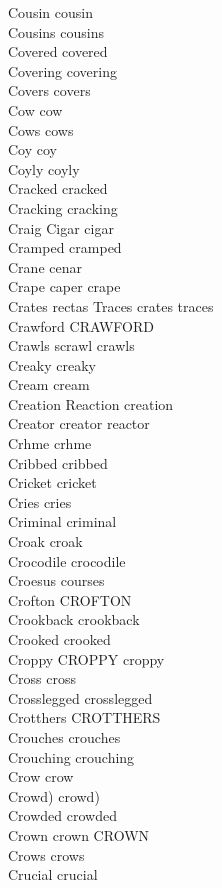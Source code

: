 Cousin cousin\\
Cousins cousins\\
Covered covered\\
Covering covering\\
Covers covers\\
Cow cow\\
Cows cows\\
Coy coy\\
Coyly coyly\\
Cracked cracked\\
Cracking cracking\\
Craig Cigar cigar\\
Cramped cramped\\
Crane cenar\\
Crape caper crape\\
Crates rectas Traces crates traces\\
Crawford CRAWFORD\\
Crawls scrawl crawls\\
Creaky creaky\\
Cream cream\\
Creation Reaction creation\\
Creator creator reactor\\
Crhme crhme\\
Cribbed cribbed\\
Cricket cricket\\
Cries cries\\
Criminal criminal\\
Croak croak\\
Crocodile crocodile\\
Croesus courses\\
Crofton CROFTON\\
Crookback crookback\\
Crooked crooked\\
Croppy CROPPY croppy\\
Cross cross\\
Crosslegged crosslegged\\
Crotthers CROTTHERS\\
Crouches crouches\\
Crouching crouching\\
Crow crow\\
Crowd) crowd)\\
Crowded crowded\\
Crown crown CROWN\\
Crows crows\\
Crucial crucial\\
